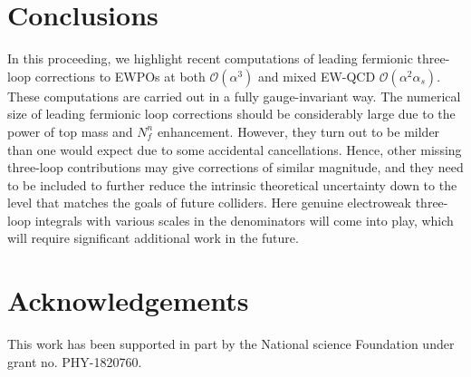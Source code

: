 \documentclass[Physsubmission, Phys]{SciPost}
\begin{document}
\section{Conclusions}
 In this proceeding, we highlight recent computations of leading fermionic three-loop corrections to EWPOs at both $\mathcal{O}(\alpha^3)$ and mixed EW-QCD $\mathcal{O}(\alpha^2\alpha_s)$. These computations are carried out in a fully gauge-invariant way. The numerical size of leading fermionic loop corrections should be considerably large due to the power of top mass and $N_f^n$ enhancement. However, they turn out to be milder than one would expect due to some accidental cancellations. Hence, other missing three-loop contributions may give corrections of similar magnitude, and they need to be included
 to further reduce the intrinsic theoretical uncertainty down to the level that matches the goals of future colliders.
Here genuine electroweak three-loop integrals with various scales in the denominators will come into play, which will require significant additional work in the future.
\section*{Acknowledgements}
This work has been supported in part by the National science Foundation under grant no. PHY-1820760.


\end{document}
